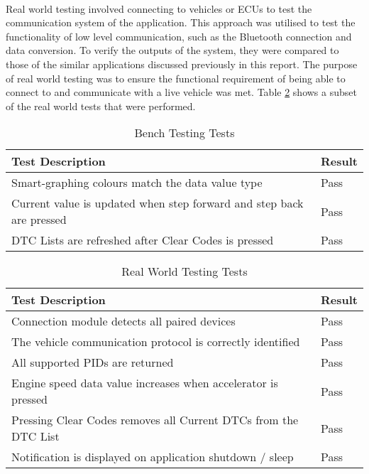 	\paragraph{}{
	Real world testing involved connecting to vehicles or ECUs to test the communication system of the application. This approach was utilised to test the functionality of low level communication, such as the Bluetooth connection and data conversion. To verify the outputs of the system, they were compared to those of the similar applications discussed previously in this report. The purpose of real world testing was to ensure the functional requirement of being able to connect to and communicate with a live vehicle was met. Table \ref{tab:RealTest} shows a subset of the real world tests that were performed.
	
	
	}
	
	\begin{table}[ht]
		\begin{center}				
			\begin{tabularx}{\textwidth}{| X | l |}
				\hline
				\textbf{Test Description} & \textbf{Result}\\
				\hline
				Smart-graphing colours match the data value type & Pass\\
				\hline
				Current value is updated when step forward and step back are pressed & Pass\\
				\hline
				DTC Lists are refreshed after Clear Codes is pressed & Pass\\
				\hline				
			\end{tabularx}
			\caption{Bench Testing Tests}
			\label{tab:BenchTest}
		\end{center}
	\end{table}
	
	\begin{table}[ht]
		\begin{center}				
			\begin{tabularx}{\textwidth}{| X | l |}
				\hline
				\textbf{Test Description} & \textbf{Result}\\
				\hline
				Connection module detects all paired devices & Pass\\
				\hline
				The vehicle communication protocol is correctly identified & Pass\\
				\hline
				All supported PIDs are returned & Pass\\
				\hline
				Engine speed data value increases when accelerator is pressed & Pass\\
				\hline				
				Pressing Clear Codes removes all Current DTCs from the DTC List & Pass\\
				\hline
				Notification is displayed on application shutdown / sleep & Pass\\
				\hline				
			\end{tabularx}
			\caption{Real World Testing Tests}
			\label{tab:RealTest}
		\end{center}
	\end{table}
	
